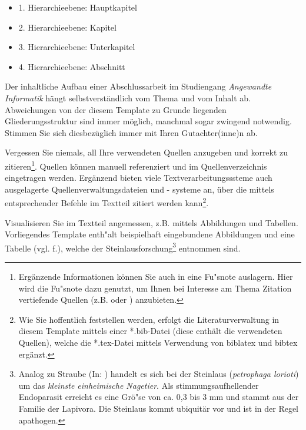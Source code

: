 \documentclass[oneside,bibliography=totocnumbered,BCOR=5mm]{scrbook}
\begin{document}
\begin{itemize}
\item 1. Hierarchieebene: Hauptkapitel
\item 2. Hierarchieebene: Kapitel
\item 3. Hierarchieebene: Unterkapitel
\item 4. Hierarchieebene: Abschnitt
\end{itemize}

Der inhaltliche Aufbau einer Abschlussarbeit im Studiengang \textit{Angewandte Informatik} h\"angt selbstverst\"andlich vom Thema und vom Inhalt ab. Abweichungen von der diesem Template zu Grunde liegenden Gliederungsstruktur sind immer m\"oglich, manchmal sogar zwingend notwendig. Stimmen Sie sich diesbez\"uglich immer mit Ihren Gutachter(inne)n ab.


Vergessen Sie niemals, all Ihre verwendeten Quellen anzugeben und korrekt zu zitieren\footnote{Erg\"anzende Informationen k\"onnen Sie auch in eine Fu"snote auslagern. Hier wird die Fu"snote dazu genutzt, um Ihnen bei Interesse am Thema Zitation vertiefende Quellen (z.B. \autocite{balzert2011} oder \autocite{franck2013}) anzubieten.}. Quellen k\"onnen manuell referenziert und im Quellenverzeichnis eingetragen werden. Erg\"anzend bieten viele Textverarbeitungsssteme auch ausgelagerte Quellenverwaltungsdateien und - systeme an,  \"uber die mittels entsprechender Befehle im Textteil zitiert werden kann\footnote{Wie Sie hoffentlich feststellen werden, erfolgt die Literaturverwaltung in diesem Template mittels einer *.bib-Datei (diese enth\"alt die verwendeten Quellen), welche die *.tex-Datei mittels Verwendung von biblatex und bibtex erg\"anzt.}.

Visualisieren Sie im Textteil angemessen, z.B. mittels Abbildungen und Tabellen. Vorliegendes Template enth"alt beispielhaft eingebundene Abbildungen und eine Tabelle (vgl. f.), welche der Steinlausforschung\footnote{Analog zu Straube (In: \autocite{pschy}) handelt es sich bei der Steinlaus (\textit{petrophaga lorioti}) um das \frqq \textit{kleinste einheimische Nagetier}\flqq. Als stimmungsaufhellender Endoparasit erreicht es eine Gr\"o"se von ca. 0,3 bis 3 mm und stammt aus der Familie der Lapivora. Die Steinlaus kommt ubiquit\"ar vor und ist in der Regel apathogen.} entnommen sind.


\end{document}
